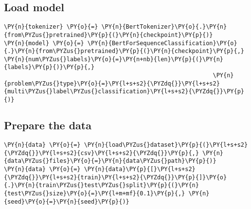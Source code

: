 \documentclass[../main.tex]{subfiles}
\begin{document}
    \subsection{Load model}\label{load-model}

    \begin{tcolorbox}[breakable, size=fbox, boxrule=1pt, pad at break*=1mm,colback=cellbackground, colframe=cellborder]
\begin{Verbatim}[commandchars=\\\{\}]
\PY{n}{tokenizer} \PY{o}{=} \PY{n}{BertTokenizer}\PY{o}{.}\PY{n}{from\PYZus{}pretrained}\PY{p}{(}\PY{n}{checkpoint}\PY{p}{)}
\PY{n}{model} \PY{o}{=} \PY{n}{BertForSequenceClassification}\PY{o}{.}\PY{n}{from\PYZus{}pretrained}\PY{p}{(}\PY{n}{checkpoint}\PY{p}{,} \PY{n}{num\PYZus{}labels}\PY{o}{=}\PY{n+nb}{len}\PY{p}{(}\PY{n}{labels}\PY{p}{)}\PY{p}{,}
                                                            \PY{n}{problem\PYZus{}type}\PY{o}{=}\PY{l+s+s2}{\PYZdq{}}\PY{l+s+s2}{multi\PYZus{}label\PYZus{}classification}\PY{l+s+s2}{\PYZdq{}}\PY{p}{)}
\end{Verbatim}
\end{tcolorbox}

    \subsection{Prepare the data}\label{prepare-the-data}

    \begin{tcolorbox}[breakable, size=fbox, boxrule=1pt, pad at break*=1mm,colback=cellbackground, colframe=cellborder]
\begin{Verbatim}[commandchars=\\\{\}]
\PY{n}{data} \PY{o}{=} \PY{n}{load\PYZus{}dataset}\PY{p}{(}\PY{l+s+s2}{\PYZdq{}}\PY{l+s+s2}{csv}\PY{l+s+s2}{\PYZdq{}}\PY{p}{,} \PY{n}{data\PYZus{}files}\PY{o}{=}\PY{n}{data\PYZus{}path}\PY{p}{)}
\PY{n}{data} \PY{o}{=} \PY{n}{data}\PY{p}{[}\PY{l+s+s2}{\PYZdq{}}\PY{l+s+s2}{train}\PY{l+s+s2}{\PYZdq{}}\PY{p}{]}\PY{o}{.}\PY{n}{train\PYZus{}test\PYZus{}split}\PY{p}{(}\PY{n}{test\PYZus{}size}\PY{o}{=}\PY{l+m+mf}{0.1}\PY{p}{,} \PY{n}{seed}\PY{o}{=}\PY{n}{seed}\PY{p}{)}
\end{Verbatim}
\end{tcolorbox}
\end{document}
